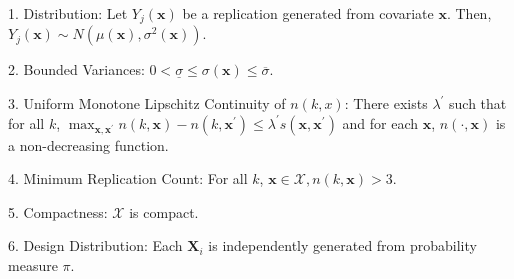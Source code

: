 \documentclass[12pt]{article}
\newcommand{\spa}[1]{\text{{$\mathcal{#1}$}}}
\newcommand{\vect}[1]{\ensuremath{\bm{#1}}}
\newcommand{\desCap}{\ensuremath{\bm{X}}}
\begin{document}
1. Distribution: Let $Y_j(\vect{x})$ be a replication generated from covariate $\vect{x}$. Then, $Y_j(\vect{x})\sim N(\mu(\vect{x}),\sigma^2(\vect{x}))$. 

2. Bounded Variances: $0<\underline{\sigma}\leq \sigma(\vect{x})\leq \overline{\sigma}$.

3. Uniform Monotone Lipschitz Continuity of $n(k,x)$: There exists $\lambda^\prime$ such that for all $k$, $\max_{\vect{x},\vect{x}^\prime}n(k,\vect{x})-n(k,\vect{x}^\prime)\leq \lambda^\prime s(\vect{x},\vect{x}^\prime)$ and for each $\vect{x}$, $n(\cdot,\vect{x})$ is a non-decreasing function.

4. Minimum Replication Count: For all $k$, $\vect{x} \in \spa{X}, n(k,\vect{x})>3$.

5. Compactness: $\spa{X}$ is compact.

6. Design Distribution: Each $\desCap_i$ is independently generated from probability measure $\pi$.
\end{document}
